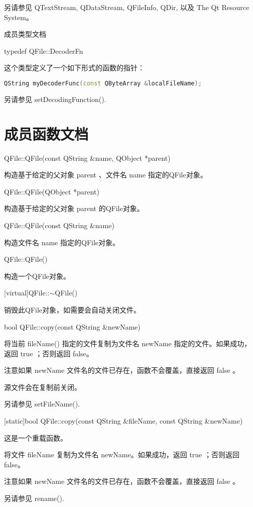 另请参见 QTextStream, QDataStream, QFileInfo, QDir, 以及 The Qt
Resource System。

\splitLine

成员类型文档

typedef QFile::DecoderFn

这个类型定义了一个如下形式的函数的指针：


\begin{lstlisting}[language=C++]
QString myDecoderFunc(const QByteArray &localFileName);
\end{lstlisting}

另请参见 setDecodingFunction().

\splitLine

\section{成员函数文档}

QFile::QFile(const QString \&name, QObject *parent)

构造基于给定的父对象 parent 、文件名 name 指定的QFile对象。

QFile::QFile(QObject *parent)

构造基于给定的父对象 parent 的QFile对象。

QFile::QFile(const QString \&name)

构造文件名 name 指定的QFile对象。

QFile::QFile()

构造一个QFile对象。

[virtual]QFile::$\sim$QFile()

销毁此QFile对象，如需要会自动关闭文件。

bool QFile::copy(const QString \&newName)

将当前 fileName() 指定的文件复制为文件名 newName 指定的文件。如果成功，返回 true ；否则返回 false。

注意如果 newName 文件名的文件已存在，函数不会覆盖，直接返回 false 。

源文件会在复制前关闭。

另请参见 setFileName().

[static]bool QFile::copy(const QString \&fileName, const QString \&newName)

这是一个重载函数。

将文件 fileName 复制为文件名 newName。如果成功，返回 true ；否则返回 false。

注意如果 newName 文件名的文件已存在，函数不会覆盖，直接返回 false 。

另请参见 rename().

